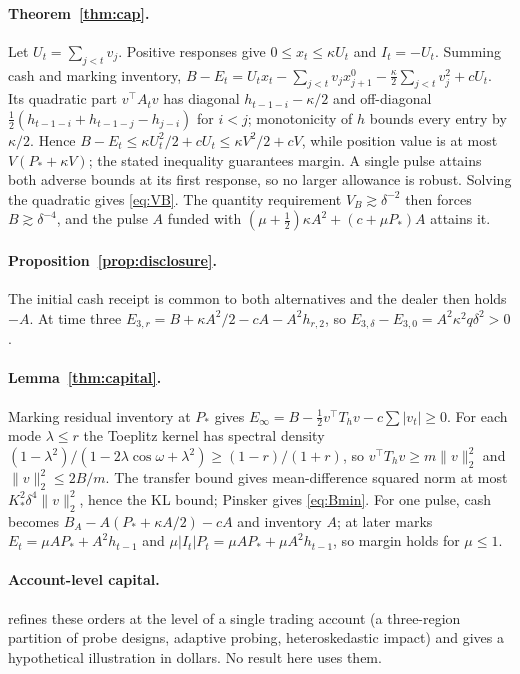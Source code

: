 \documentclass[12pt]{article}
\theoremstyle{definition}
\theoremstyle{remark}
\begin{document}
\paragraph{Theorem~\ref{thm:cap}.} Let $U_t=\sum_{j<t}v_j$. Positive responses give $0\le x_t\le\kappa U_t$ and $I_t=-U_t$. Summing cash and marking inventory, $B-E_t=U_tx_t-\sum_{j<t}v_jx^0_{j+1}-\tfrac\kappa2\sum_{j<t}v_j^2+cU_t$. Its quadratic part $v^\top A_tv$ has diagonal $h_{t-1-i}-\kappa/2$ and off-diagonal $\tfrac12(h_{t-1-i}+h_{t-1-j}-h_{j-i})$ for $i<j$; monotonicity of $h$ bounds every entry by $\kappa/2$. Hence $B-E_t\le\kappa U_t^2/2+cU_t\le\kappa V^2/2+cV$, while position value is at most $V(P_*+\kappa V)$; the stated inequality guarantees margin. A single pulse attains both adverse bounds at its first response, so no larger allowance is robust. Solving the quadratic gives \eqref{eq:VB}. The quantity requirement $V_B\gtrsim\delta^{-2}$ then forces $B\gtrsim\delta^{-4}$, and the pulse $A$ funded with $(\mu+\tfrac12)\kappa A^2+(c+\mu P_*)A$ attains it.


\paragraph{Proposition~\ref{prop:disclosure}.} The initial cash receipt is common to both alternatives and the dealer then holds $-A$. At time three $E_{3,r}=B+\kappa A^2/2-cA-A^2h_{r,2}$, so $E_{3,\delta}-E_{3,0}=A^2\kappa^2q\delta^2>0$.


\paragraph{Lemma~\ref{thm:capital}.} Marking residual inventory at $P_*$ gives $E_\infty=B-\tfrac12v^\top T_hv-c\sum|v_t|\ge0$. For each mode $\lambda\le r$ the Toeplitz kernel has spectral density $(1-\lambda^2)/(1-2\lambda\cos\omega+\lambda^2)\ge(1-r)/(1+r)$, so $v^\top T_hv\ge m\|v\|_2^2$ and $\|v\|_2^2\le2B/m$. The transfer bound gives mean-difference squared norm at most $K_*^2\delta^4\|v\|_2^2$, hence the KL bound; Pinsker gives \eqref{eq:Bmin}. For one pulse, cash becomes $B_A-A(P_*+\kappa A/2)-cA$ and inventory $A$; at later marks $E_t=\mu AP_*+A^2h_{t-1}$ and $\mu|I_t|P_t=\mu AP_*+\mu A^2h_{t-1}$, so margin holds for $\mu\le1$.


\paragraph{Account-level capital.} \citet{niroula2026a} refines these orders at the level of a single trading account (a three-region partition of probe designs, adaptive probing, heteroskedastic impact) and gives a hypothetical illustration in dollars. No result here uses them.
\end{document}
